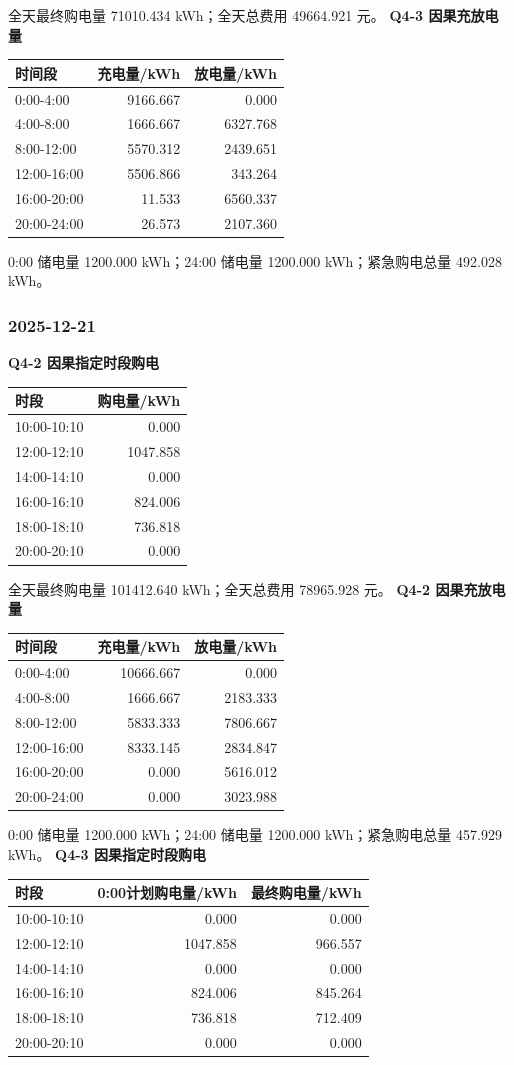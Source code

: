全天最终购电量 71010.434 kWh；全天总费用 49664.921 元。
\textbf{Q4-3 因果充放电量}
\begin{longtable}[]{@{}lrr@{}}\toprule 时间段&充电量/kWh&放电量/kWh\\\midrule\endhead
0:00-4:00&9166.667&0.000\\4:00-8:00&1666.667&6327.768\\8:00-12:00&5570.312&2439.651\\12:00-16:00&5506.866&343.264\\16:00-20:00&11.533&6560.337\\20:00-24:00&26.573&2107.360\\\bottomrule\end{longtable}
0:00 储电量 1200.000 kWh；24:00 储电量 1200.000 kWh；紧急购电总量 492.028 kWh。

\subsubsection{2025-12-21}
\textbf{Q4-2 因果指定时段购电}
\begin{longtable}[]{@{}lr@{}}\toprule 时段&购电量/kWh\\\midrule\endhead
10:00-10:10&0.000\\12:00-12:10&1047.858\\14:00-14:10&0.000\\16:00-16:10&824.006\\18:00-18:10&736.818\\20:00-20:10&0.000\\\bottomrule\end{longtable}
全天最终购电量 101412.640 kWh；全天总费用 78965.928 元。
\textbf{Q4-2 因果充放电量}
\begin{longtable}[]{@{}lrr@{}}\toprule 时间段&充电量/kWh&放电量/kWh\\\midrule\endhead
0:00-4:00&10666.667&0.000\\4:00-8:00&1666.667&2183.333\\8:00-12:00&5833.333&7806.667\\12:00-16:00&8333.145&2834.847\\16:00-20:00&0.000&5616.012\\20:00-24:00&0.000&3023.988\\\bottomrule\end{longtable}
0:00 储电量 1200.000 kWh；24:00 储电量 1200.000 kWh；紧急购电总量 457.929 kWh。
\textbf{Q4-3 因果指定时段购电}
\begin{longtable}[]{@{}lrr@{}}\toprule 时段&0:00计划购电量/kWh&最终购电量/kWh\\\midrule\endhead
10:00-10:10&0.000&0.000\\12:00-12:10&1047.858&966.557\\14:00-14:10&0.000&0.000\\16:00-16:10&824.006&845.264\\18:00-18:10&736.818&712.409\\20:00-20:10&0.000&0.000\\\bottomrule\end{longtable}
